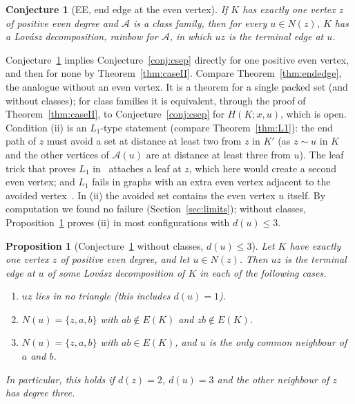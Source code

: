 \documentclass[11pt]{amsart}
\newtheorem{proposition}[theorem]{Proposition}
\newtheorem{conjecture}[theorem]{Conjecture}
\theoremstyle{definition}
\newcommand{\cA}{\mathcal A}
\begin{document}
\begin{conjecture}[EE, end edge at the even vertex]\label{conj:EE}
If $K$ has exactly one vertex $z$ of positive even degree and $\cA$ is a class family, then for every
$u\in N(z)$, $K$ has a Lov\'asz decomposition, rainbow for $\cA$, in which $uz$ is the terminal edge at $u$.
\end{conjecture}

Conjecture~\ref{conj:EE} implies Conjecture~\ref{conj:csep} directly for one positive even vertex, and then
for none by Theorem~\ref{thm:caseII}. Compare Theorem~\ref{thm:endedge}, the analogue without an even vertex.
It is a theorem for a single packed set (and without classes); for class families it is equivalent,
through the proof of Theorem~\ref{thm:caseII}, to Conjecture~\ref{conj:csep} for $H(K;x,u)$, which is
open. Condition (ii) is an $L_1$-type statement (compare Theorem~\ref{thm:L1}): the end path of $z$ must
avoid a set at distance at least two from $z$ in $K'$ (as $z\sim u$ in $K$ and the other vertices of
$\cA(u)$ are at distance at least three from $u$). The leaf trick that proves $L_1$
in~\cite[Theorem~6.3]{RD} attaches a leaf at $z$, which here would create a second even vertex; and $L_1$
fails in graphs with an extra even vertex adjacent to the avoided vertex~\cite[Remark~6.7]{RD}. In (ii)
the avoided set contains the even vertex $u$ itself. By computation we found no failure
(Section~\ref{sec:limits}); without classes, Proposition~\ref{prop:EE3} proves (ii) in most configurations
with $d(u)\le3$.

\begin{proposition}[Conjecture~\ref{conj:EE} without classes, $d(u)\le3$]\label{prop:EE3}
Let $K$ have exactly one vertex $z$ of positive even degree, and let $u\in N(z)$. Then $uz$ is the terminal
edge at $u$ of some Lov\'asz decomposition of $K$ in each of the following cases.
\begin{enumerate}
\item[(a)] $uz$ lies in no triangle (this includes $d(u)=1$).
\item[(b)] $N(u)=\{z,a,b\}$ with $ab\notin E(K)$ and $zb\notin E(K)$.
\item[(c)] $N(u)=\{z,a,b\}$ with $ab\in E(K)$, and $u$ is the only common neighbour of $a$ and $b$.
\end{enumerate}
In particular, this holds if $d(z)=2$, $d(u)=3$ and the other neighbour of $z$ has degree three.
\end{proposition}
\end{document}
